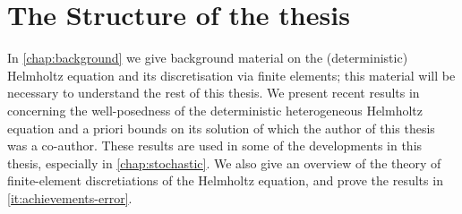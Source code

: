   
  


\section{The Structure of the thesis}

In \cref{chap:background} we give background material on the (deterministic) Helmholtz equation and its discretisation via finite elements; this material will be necessary to understand the rest of this thesis. We present recent results in \cite{GrPeSp:19} concerning the well-posedness of the deterministic heterogeneous Helmholtz equation and a priori bounds on its solution of which the author of this thesis was a co-author. These results are used in some of the developments in this thesis, especially in \cref{chap:stochastic}. We also give an overview of the theory of finite-element discretiations of the Helmholtz equation, and prove the results in \cref{it:achievements-error}.

